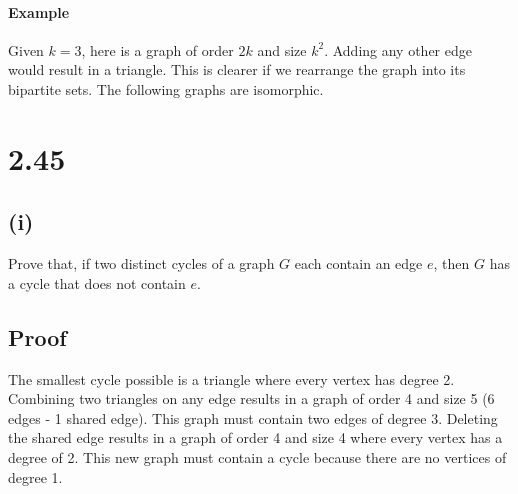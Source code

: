 \documentclass[11pt]{article}
\begin{document}
\paragraph{Example}

Given $k=3$, here is a graph of order $2k$ and size $k^2$.
Adding any other edge would result in a triangle.
This is clearer if we rearrange the graph into its bipartite sets.
The following graphs are isomorphic.

\quad
{}

\section*{2.45}

\subsection*{(i)}
Prove that, if two distinct cycles of a graph $G$ each contain an edge $e$, then $G$ has a cycle that does not contain $e$.

\subsection*{Proof}

The smallest cycle possible is a triangle where every vertex has degree 2.
Combining two triangles on any edge results in a graph of order 4 and size 5 (6 edges - 1 shared edge).
This graph must contain two edges of degree 3.
Deleting the shared edge results in a graph of order 4 and size 4 where every vertex has a degree of 2.
This new graph must contain a cycle because there are no vertices of degree 1.
\end{document}
